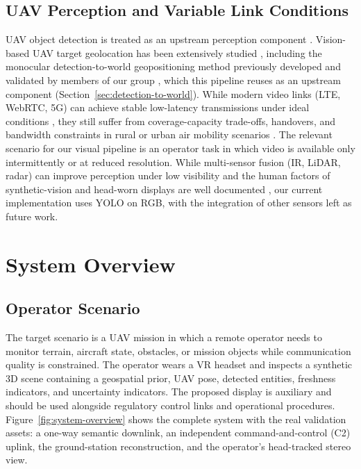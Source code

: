 \documentclass[fleqn]{VRIH2025}
\begin{document}
\subsection{UAV Perception and Variable Link Conditions}
UAV object detection is treated as an upstream perception component \cite{cao2023uavdetection}. Vision-based UAV target geolocation has been extensively studied \cite{barber2006geolocation, hosseinpoor2016geolocation, liu2024multiview}, including the monocular detection-to-world geopositioning method previously developed and validated by members of our group \cite{alaez2023geopositioning}, which this pipeline reuses as an upstream component (Section~\ref{sec:detection-to-world}). While modern video links (LTE, WebRTC, 5G) can achieve stable low-latency transmissions under ideal conditions \cite{mohamed2025lteuav, chodorek2025webrtc}, they still suffer from coverage-capacity trade-offs, handovers, and bandwidth constraints in rural or urban air mobility scenarios \cite{chen2025uamstreaming, chintareddy2026vertical}. The relevant scenario for our visual pipeline is an operator task in which video is available only intermittently or at reduced resolution. While multi-sensor fusion (IR, LiDAR, radar) can improve perception under low visibility \cite{li2025irvisuav, farina2026lidarradar} and the human factors of synthetic-vision and head-worn displays are well documented \cite{fercho2026faa_svs}, our current implementation uses YOLO on RGB, with the integration of other sensors left as future work.

\section{System Overview}

\subsection{Operator Scenario}
\label{sec:operator-scenario}
The target scenario is a UAV mission in which a remote operator needs to monitor terrain, aircraft state, obstacles, or mission objects while communication quality is constrained. The operator wears a VR headset and inspects a synthetic 3D scene containing a geospatial prior, UAV pose, detected entities, freshness indicators, and uncertainty indicators. The proposed display is auxiliary and should be used alongside regulatory control links and operational procedures. Figure~\ref{fig:system-overview} shows the complete system with the real validation assets: a one-way semantic downlink, an independent command-and-control (C2) uplink, the ground-station reconstruction, and the operator's head-tracked stereo view.
\end{document}

